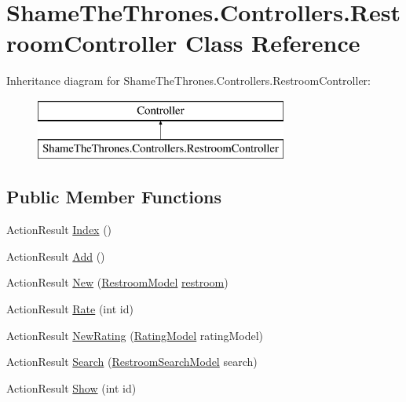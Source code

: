 \hypertarget{class_shame_the_thrones_1_1_controllers_1_1_restroom_controller}{}\section{Shame\+The\+Thrones.\+Controllers.\+Restroom\+Controller Class Reference}
\label{class_shame_the_thrones_1_1_controllers_1_1_restroom_controller}
Inheritance diagram for Shame\+The\+Thrones.\+Controllers.\+Restroom\+Controller\+:\begin{figure}[H]
\begin{center}
\leavevmode
\includegraphics[height=2.000000cm]{da/d98/class_shame_the_thrones_1_1_controllers_1_1_restroom_controller}
\end{center}
\end{figure}
\subsection*{Public Member Functions}
\begin{DoxyCompactItemize}
\item 
Action\+Result \hyperlink{class_shame_the_thrones_1_1_controllers_1_1_restroom_controller_acd1345cbe2b9927c91a2219f4129b361}{Index} ()
\item 
Action\+Result \hyperlink{class_shame_the_thrones_1_1_controllers_1_1_restroom_controller_ae854b6f266a493a2e0ab04c2e6d24889}{Add} ()
\item 
Action\+Result \hyperlink{class_shame_the_thrones_1_1_controllers_1_1_restroom_controller_a204fc77e02acb675e0cfc68b3c8bae22}{New} (\hyperlink{class_shame_the_thrones_1_1_models_1_1_restroom_model}{Restroom\+Model} \hyperlink{typescriptcombined_8js_a6f245fd3da421ab8da36b2973e8a3bd4}{restroom})
\item 
Action\+Result \hyperlink{class_shame_the_thrones_1_1_controllers_1_1_restroom_controller_abbff12d5304bce3a91319d3a958a964f}{Rate} (int id)
\item 
Action\+Result \hyperlink{class_shame_the_thrones_1_1_controllers_1_1_restroom_controller_a2b05f2c80ac3c536f30d42c3eac363fe}{New\+Rating} (\hyperlink{class_shame_the_thrones_1_1_models_1_1_rating_model}{Rating\+Model} rating\+Model)
\item 
Action\+Result \hyperlink{class_shame_the_thrones_1_1_controllers_1_1_restroom_controller_a894742fe1e689a3d1ceec67b5f5274ca}{Search} (\hyperlink{class_shame_the_thrones_1_1_models_1_1_restroom_search_model}{Restroom\+Search\+Model} search)
\item 
Action\+Result \hyperlink{class_shame_the_thrones_1_1_controllers_1_1_restroom_controller_a9aae4ac0b978e046531592267d0032ec}{Show} (int id)
\end{DoxyCompactItemize}


